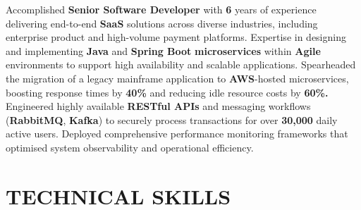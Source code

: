 \documentclass[10pt, letterpaper]{article}
\begin{document}
        Accomplished \textbf{Senior Software Developer} with \textbf{6} years of experience delivering end-to-end \textbf{SaaS} solutions across diverse industries, including enterprise product and high-volume payment platforms. Expertise in designing and implementing \textbf{Java} and \textbf{Spring Boot} \textbf{microservices} within \textbf{Agile} environments to support high availability and scalable applications. Spearheaded the migration of a legacy mainframe application to \textbf{AWS}-hosted microservices, boosting response times by \textbf{40\%} and reducing idle resource costs by \textbf{60\%.} Engineered highly available \textbf{RESTful APIs} and messaging workflows (\textbf{RabbitMQ}, \textbf{Kafka}) to securely process transactions for over \textbf{30,000} daily active users. Deployed comprehensive performance monitoring frameworks that optimised system observability and operational efficiency. 

    \vspace{0.1 cm}
    \section{TECHNICAL SKILLS}
    \vspace{0.1 cm}
\end{document}

